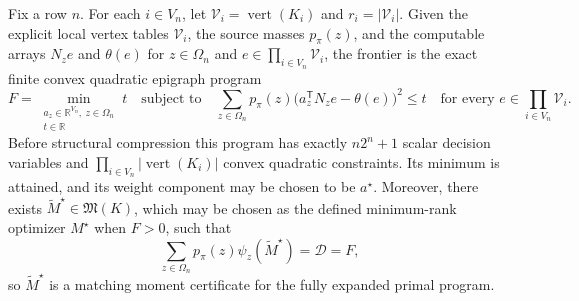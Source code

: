 Fix a row \(n\).  For each \(i\in V_n\), let \(\mathcal V_i=\operatorname{vert}(K_i)\) and \(r_i=|\mathcal V_i|\).  Given the explicit local vertex tables \(\mathcal V_i\), the source masses \(p_{\pi}(z)\), and the computable arrays \(N_ze\) and \(\theta(e)\) for \(z\in\Omega_n\) and \(e\in\prod_{i\in V_n}\mathcal V_i\), the frontier is the exact finite convex quadratic epigraph program
\[
 F=\min_{\substack{a_z\in\mathbb R^{V_n},\ z\in\Omega_n\\ t\in\mathbb R}}t
 \quad\text{subject to}\quad
 \sum_{z\in\Omega_n}p_{\pi}(z)
 \bigl(a_z^{\mathsf T}N_ze-\theta(e)\bigr)^2\le t
 \quad\text{for every }e\in\prod_{i\in V_n}\mathcal V_i.
\]
Before structural compression this program has exactly \(n2^n+1\) scalar decision variables and \(\prod_{i\in V_n}|\operatorname{vert}(K_i)|\) convex quadratic constraints.  Its minimum is attained, and its weight component may be chosen to be \(a^{\star}\).  Moreover, there exists \(\widetilde M^{\star}\in\mathfrak M(K)\), which may be chosen as the defined minimum-rank optimizer \(M^{\star}\) when \(F>0\), such that
\[
 \sum_{z\in\Omega_n}p_{\pi}(z)\psi_z(\widetilde M^{\star})
 =\mathcal D=F,
\]
so \(\widetilde M^{\star}\) is a matching moment certificate for the fully expanded primal program.